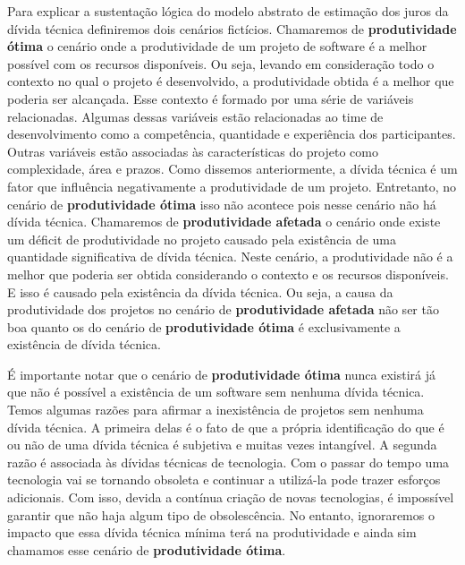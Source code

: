 Para explicar a sustentação lógica do modelo abstrato de estimação dos juros da dívida técnica definiremos dois cenários fictícios. Chamaremos de \textbf{produtividade ótima} o cenário onde a produtividade de um projeto de software é a melhor possível com os recursos disponíveis. Ou seja, levando em consideração todo o contexto no qual o projeto é desenvolvido, a produtividade obtida é a melhor que poderia ser alcançada. Esse contexto é formado por uma série de variáveis relacionadas.  Algumas dessas variáveis estão relacionadas ao time de desenvolvimento como a competência, quantidade e experiência dos participantes. Outras variáveis estão associadas às características do projeto como complexidade, área e prazos. Como dissemos anteriormente, a dívida técnica é um fator que influência negativamente a produtividade de um projeto. Entretanto,  no cenário de \textbf{produtividade ótima} isso não acontece pois nesse cenário não há dívida técnica. Chamaremos de \textbf{produtividade afetada} o cenário onde existe um déficit de produtividade no projeto causado pela existência de uma quantidade significativa de dívida técnica. Neste cenário, a produtividade não é a melhor que poderia ser obtida considerando o contexto e os recursos disponíveis. E isso é causado pela existência da dívida técnica. Ou seja, a causa da  produtividade dos projetos  no cenário de \textbf{produtividade afetada} não ser tão boa quanto os do cenário de  \textbf{produtividade ótima} é exclusivamente a existência de dívida técnica.  

É importante notar que o cenário  de \textbf{produtividade ótima} nunca existirá já que não é possível a existência de um software sem nenhuma dívida técnica. Temos algumas razões para afirmar a inexistência de projetos sem nenhuma dívida técnica. A primeira delas é o fato de que a própria identificação do que é ou não de uma dívida técnica é subjetiva e muitas vezes intangível. A segunda razão é associada às dívidas técnicas de tecnologia. Com o passar do tempo uma tecnologia vai se tornando obsoleta e continuar a utilizá-la pode trazer esforços adicionais. Com isso, devida a contínua criação de novas tecnologias, é impossível garantir que não haja algum tipo de obsolescência. No entanto, ignoraremos o impacto que essa dívida técnica mínima terá na produtividade e ainda sim chamamos esse cenário de \textbf{produtividade ótima}.


